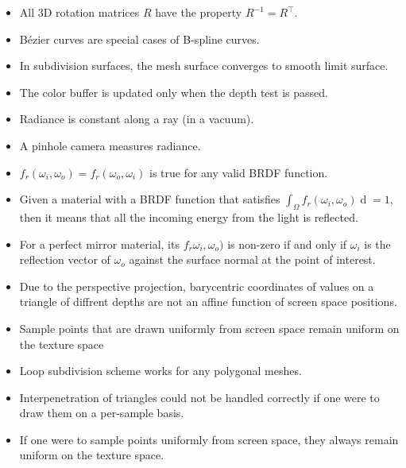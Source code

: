 \documentclass[a4paper,10pt]{article}
\newcommand{\cmark}{\text{\ding{51}}}
\newcommand{\xmark}{\text{\ding{55}}}
\begin{document}
\begin{itemize}
    \item[\cmark] All 3D rotation matrices \( R \) have the property \( R^{-1} = R^\top \).
    \item[\cmark] Bézier curves are special cases of B-spline curves.
    \item[\cmark] In subdivision surfaces, the mesh surface converges to smooth limit surface.
    \item[\cmark] The color buffer is updated only when the depth test is passed.
    \item[\cmark] Radiance is constant along a ray (in a vacuum).
    \item[\cmark] A pinhole camera measures radiance.
    \item[\cmark] \( f_r(\omega_i, \omega_o) = f_r(\omega_o, \omega_i) \) is true for any valid BRDF function.
    \item[\cmark] Given a material with a BRDF function that satisfies \( \int_\Omega f_r(\omega_i, \omega_o) \mathop{d\omega_i} = 1 \), then it means that all the incoming energy from the light is reflected.
    \item[\cmark] For a perfect mirror material, its \( f_r \omega _i, \omega _o) \) is non-zero if and only if \( \omega _i \) is the reflection vector of \( \omega _o \) against the surface normal at the point of interest.
    \item[\cmark] Due to the perspective projection, barycentric coordinates of values on a triangle of diffrent depths are not an affine function of screen space positions.
    \item[\xmark] Sample points that are drawn uniformly from screen space remain uniform on the texture space
    \item[\xmark] Loop subdivision scheme works for any polygonal meshes.
    \item[\xmark] Interpenetration of triangles could not be handled correctly if one were to draw them on a per-sample basis.
    \item[\xmark] If one were to sample points uniformly from screen space, they always remain uniform on the texture space.
\end{itemize}
\end{document}
